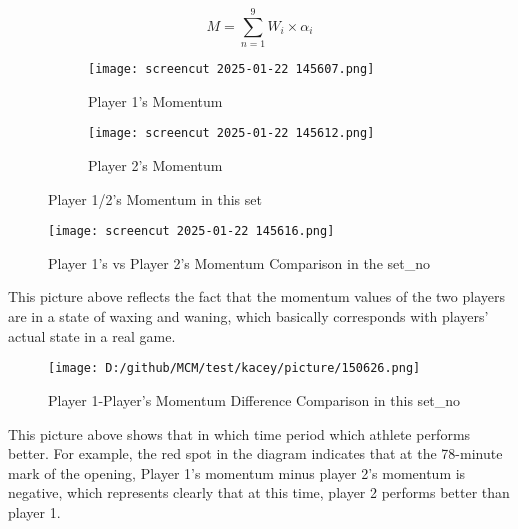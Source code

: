 \documentclass{mcmthesis}
\begin{document}
\begin{equation} \label{(2)}
    M= \sum_{n=1}^{9} W_{i}\times \alpha_{i}  
\end{equation}
\begin{figure}[htbp]
    \centering
    \begin{subfigure}{0.45\textwidth}
        \centering
        \texttt{[image: screencut 2025-01-22 145607.png]}
        \caption{Player 1's Momentum}
        \label{subfig:player1}
    \end{subfigure}
    \hfill
    \begin{subfigure}{0.45\textwidth}
        \centering
        \texttt{[image: screencut 2025-01-22 145612.png]}
        \caption{Player 2's Momentum}
        \label{subfig:player2}
    \end{subfigure}
    \caption{Player 1/2's Momentum in this set}
    \label{Figure6-7}
\end{figure}
\begin{figure}[htbp]
    \centering
    \texttt{[image: screencut 2025-01-22 145616.png]}
    \caption{Player 1's vs Player 2's Momentum Comparison in the set\_no} \label{Figure 6}
\end{figure}

This picture above reflects the fact that the momentum values of the two players are in a state
of waxing and waning, which basically corresponds with players' actual state in a real game.\cite{3}

\begin{figure}[htbp]
    \centering
    \texttt{[image: D:/github/MCM/test/kacey/picture/150626.png]}
    \caption{Player 1-Player's Momentum Difference Comparison in this set\_no} \label{Figure 7}
\end{figure}

This picture above shows that in which time period which athlete performs better. For
example, the red spot in the diagram indicates that at the 78-minute mark of the opening, Player
1's momentum minus player 2's momentum is negative, which represents clearly that at this time, player 2 performs better than player 1.
\end{document}
